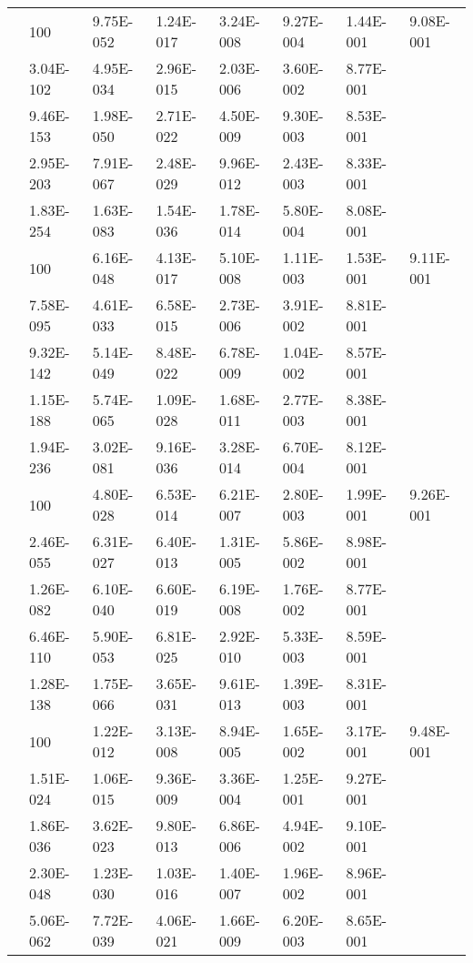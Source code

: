 \begin{table}[t]
\begin{tabular}{|c||l||l|l|l|l|l|l|}
  
    \hhline{|=#=#=|=|=|=|=|=|}
    \multicolumn{1}{|c||}{\multirow{5}{*}{$0.9$}}&
    100 & 9.75E-052 & 1.24E-017 & 3.24E-008 & 9.27E-004 & 1.44E-001 & 9.08E-001   \\ \EndRow
    200 & 3.04E-102 & 4.95E-034 & 2.96E-015 & 2.03E-006 & 3.60E-002 & 8.77E-001   \\ \EndRow
    300 & 9.46E-153 & 1.98E-050 & 2.71E-022 & 4.50E-009 & 9.30E-003 & 8.53E-001   \\ \EndRow
    400 & 2.95E-203 & 7.91E-067 & 2.48E-029 & 9.96E-012 & 2.43E-003 & 8.33E-001   \\ \EndRow
    500 & 1.83E-254 & 1.63E-083 & 1.54E-036 & 1.78E-014 & 5.80E-004 & 8.08E-001   \\%

  
    \hhline{|=#=#=|=|=|=|=|=|}
    \multicolumn{1}{|c||}{\multirow{5}{*}{$0.8$}}&
    100 & 6.16E-048 & 4.13E-017 & 5.10E-008 & 1.11E-003 & 1.53E-001 & 9.11E-001 \\ \EndRow
    200 & 7.58E-095 & 4.61E-033 & 6.58E-015 & 2.73E-006 & 3.91E-002 & 8.81E-001 \\ \EndRow
    300 & 9.32E-142 & 5.14E-049 & 8.48E-022 & 6.78E-009 & 1.04E-002 & 8.57E-001 \\ \EndRow
    400 & 1.15E-188 & 5.74E-065 & 1.09E-028 & 1.68E-011 & 2.77E-003 & 8.38E-001 \\ \EndRow
    500 & 1.94E-236 & 3.02E-081 & 9.16E-036 & 3.28E-014 & 6.70E-004 & 8.12E-001 \\ 

 
    \hhline{|=#=#=|=|=|=|=|=|}
    \multicolumn{1}{|c||}{\multirow{5}{*}{$0.5$}}&
    100 & 4.80E-028 & 6.53E-014 & 6.21E-007 & 2.80E-003 & 1.99E-001 & 9.26E-001 \\ \EndRow
    200 & 2.46E-055 & 6.31E-027 & 6.40E-013 & 1.31E-005 & 5.86E-002 & 8.98E-001 \\ \EndRow
    300 & 1.26E-082 & 6.10E-040 & 6.60E-019 & 6.19E-008 & 1.76E-002 & 8.77E-001 \\ \EndRow
    400 & 6.46E-110 & 5.90E-053 & 6.81E-025 & 2.92E-010 & 5.33E-003 & 8.59E-001 \\ \EndRow
    500 & 1.28E-138 & 1.75E-066 & 3.65E-031 & 9.61E-013 & 1.39E-003 & 8.31E-001 \\ 


    \hhline{|=#=#=|=|=|=|=|=|}
    \multicolumn{1}{|c||}{\multirow{5}{*}{$0.25$}}&
    100 & 1.22E-012 & 3.13E-008 & 8.94E-005 & 1.65E-002 & 3.17E-001 & 9.48E-001 \\ \EndRow
    200 & 1.51E-024 & 1.06E-015 & 9.36E-009 & 3.36E-004 & 1.25E-001 & 9.27E-001 \\ \EndRow
    300 & 1.86E-036 & 3.62E-023 & 9.80E-013 & 6.86E-006 & 4.94E-002 & 9.10E-001 \\ \EndRow
    400 & 2.30E-048 & 1.23E-030 & 1.03E-016 & 1.40E-007 & 1.96E-002 & 8.96E-001 \\ \EndRow
    500 & 5.06E-062 & 7.72E-039 & 4.06E-021 & 1.66E-009 & 6.20E-003 & 8.65E-001 \\ 


\end{tabular}
\end{table}
